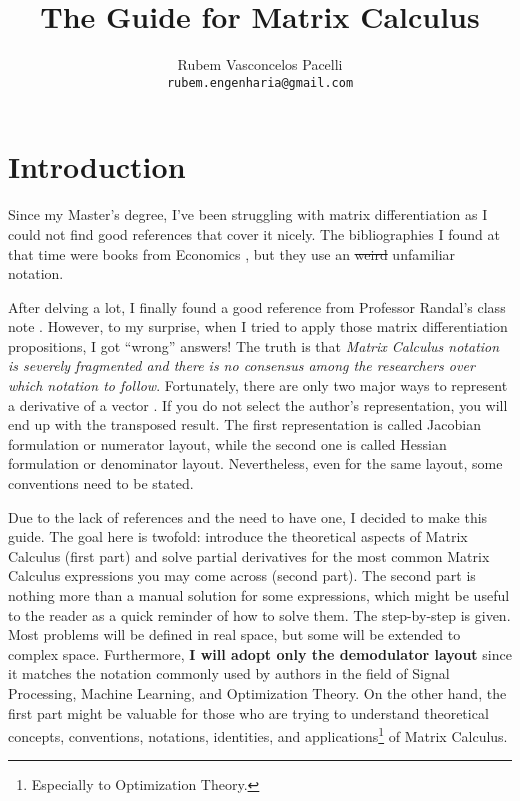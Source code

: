 \documentclass{article}
\title{\textbf{The Guide for Matrix Calculus}  \vspace{-.3cm}}
\author{Rubem Vasconcelos Pacelli\\
  {\tt rubem.engenharia@gmail.com}}
\affil{Department of Teleinformatics Engineering, Federal University of Ceará.\\Fortaleza, Ceará, Brazil. \vspace{-.5cm}}
\begin{document}
\maketitle
\tableofcontents
\newpage
\section{Introduction}
Since my Master's degree, I've been struggling with matrix differentiation as I could not find good references that cover it nicely. The bibliographies I found at that time were books from Economics \cite{dhrymes1978mathematics}, but they use an \st{weird} unfamiliar notation.

After delving a lot, I finally found a good reference from Professor Randal's class note \cite{barnes2006matrix}. However, to my surprise, when I tried to apply those matrix differentiation propositions, I got ``wrong'' answers! The truth is that \emph{Matrix Calculus notation is severely fragmented and there is no consensus among the researchers over which notation to follow}. Fortunately, there are only two major ways to represent a derivative of a vector \cite{Singh}. If you do not select the author's representation, you will end up with the transposed result. The first representation is called Jacobian formulation or numerator layout, while the second one is called Hessian formulation or denominator layout. Nevertheless, even for the same layout, some conventions need to be stated.

Due to the lack of references and the need to have one, I decided to make this guide. The goal here is twofold: introduce the theoretical aspects of Matrix Calculus (first part) and solve partial derivatives for the most common Matrix Calculus expressions you may come across (second part). The second part is nothing more than a manual solution for some expressions, which might be useful to the reader as a quick reminder of how to solve them. The step-by-step is given. Most problems will be defined in real space, but some will be extended to complex space. Furthermore, \textbf{I will adopt only the demodulator layout} since it matches the notation commonly used by authors in the field of Signal Processing, Machine Learning, and Optimization Theory. On the other hand, the first part might be valuable for those who are trying to understand theoretical concepts, conventions, notations, identities, and applications\footnote{Especially to Optimization Theory.} of Matrix Calculus.
\end{document}
